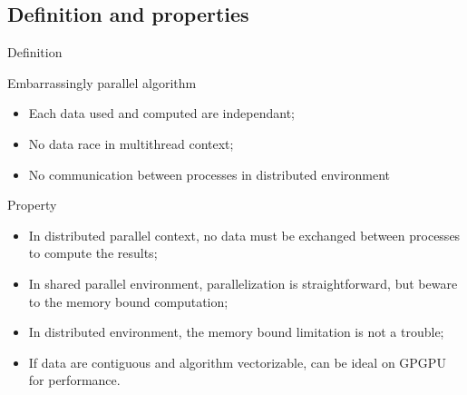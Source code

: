 \documentclass[compress,10pt,aspectratio=169]{beamer}
\begin{document}
\subsection{Definition and properties}
\begin{frame}[fragile]{Definition}
    \scriptsize
    \begin{block}{Embarrassingly parallel algorithm}
        \begin{itemize}
            \item Each data used and computed are independant;
            \item No data race in multithread context;
            \item No communication between processes in distributed environment
        \end{itemize}
    \end{block}

    \begin{exampleblock}{Property}
        \begin{itemize}
            \item In distributed parallel context, no data must be exchanged between processes to compute the results;
            \item In shared parallel environment, parallelization is straightforward, but beware to the memory bound computation;
            \item In distributed environment, the memory bound limitation is not a trouble;
            \item If data are contiguous and algorithm vectorizable, can be ideal on GPGPU for performance.
        \end{itemize}
    \end{exampleblock}
\end{frame}
\end{document}
